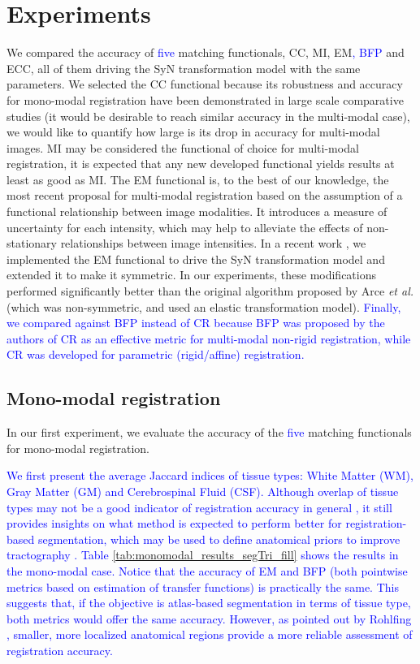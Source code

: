 \section{Experiments}
We compared the accuracy of \textcolor{blue}{five} matching functionals, CC, MI, EM\textcolor{blue}{, BFP} and ECC, all of them driving the SyN transformation model with the same parameters. We selected the CC functional because its robustness and accuracy for mono-modal registration have been demonstrated in large scale comparative studies \cite{Klein2009, Klein2010, Rohlfing2012} (it would be desirable to reach similar accuracy in the multi-modal case), we would like to quantify how large is its drop in accuracy for multi-modal images. MI \cite{Maes1997, Mattes2003} may be considered the functional of choice for multi-modal registration, it is expected that any new developed functional yields results at least as good as MI. The EM functional \cite{Arce-santana2014} is, to the best of our knowledge, the most recent proposal for multi-modal registration based on the assumption of a functional relationship between image modalities. It introduces a measure of uncertainty for each intensity, which may help to alleviate the effects of non-stationary relationships between image intensities. In a recent work \cite{Ocegueda2015}, we implemented the EM functional to drive the SyN transformation model and extended it to make it symmetric. In our experiments, these modifications performed significantly better than the original algorithm proposed by Arce {\it et al.} \cite{Arce-santana2014} (which was non-symmetric, and used an elastic transformation model). \textcolor{blue}{Finally, we compared against BFP \cite{Guimond2001} instead of CR because BFP was proposed by the authors of CR as an effective metric for multi-modal non-rigid registration, while CR was developed for parametric (rigid/affine) registration.}

\subsection{Mono-modal registration}
In our first experiment, we evaluate the accuracy of the \textcolor{blue}{five} matching functionals for mono-modal registration. \textcolor{blue}{We first present the average Jaccard indices of tissue types: White Matter (WM), Gray Matter (GM) and Cerebrospinal Fluid (CSF). Although overlap of tissue types may not be a good indicator of registration accuracy in general \cite{Rohlfing2012}, it still provides insights on what method is expected to perform better for registration-based segmentation, which may be used to define anatomical priors to improve tractography \cite{Smith2012, Girard2014}. Table \ref{tab:monomodal_results_segTri_fill} shows the results in the mono-modal case. Notice that the accuracy of EM and BFP (both pointwise metrics based on estimation of transfer functions) is practically the same. This suggests that, if the objective is atlas-based segmentation in terms of tissue type, both metrics would offer the same accuracy. However, as pointed out by Rohlfing \cite{Rohlfing2012}, smaller, more localized anatomical regions provide a more reliable assessment of registration accuracy. 

}

